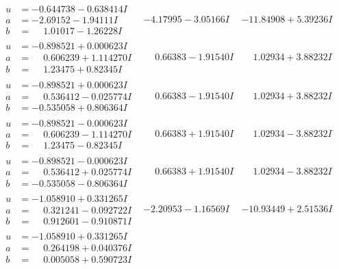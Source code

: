 \documentclass[1p]{elsarticle_modified}
\theoremstyle{definition}
\begin{document}
$$\begin{array}{c|c|c}
\begin{aligned}
u &= -0.644738 - 0.638414 I \\
a &= -2.69152 - 1.94111 I \\
b &= \phantom{-}1.01017 - 1.26228 I\end{aligned}
 & -4.17995 - 3.05166 I & -11.84908 + 5.39236 I \\ \hline\begin{aligned}
u &= -0.898521 + 0.000623 I \\
a &= \phantom{-}0.606239 + 1.114270 I \\
b &= \phantom{-}1.23475 + 0.82345 I\end{aligned}
 & \phantom{-}0.66383 - 1.91540 I & \phantom{-}1.02934 + 3.88232 I \\ \hline\begin{aligned}
u &= -0.898521 + 0.000623 I \\
a &= \phantom{-}0.536412 - 0.025774 I \\
b &= -0.535058 + 0.806364 I\end{aligned}
 & \phantom{-}0.66383 - 1.91540 I & \phantom{-}1.02934 + 3.88232 I \\ \hline\begin{aligned}
u &= -0.898521 - 0.000623 I \\
a &= \phantom{-}0.606239 - 1.114270 I \\
b &= \phantom{-}1.23475 - 0.82345 I\end{aligned}
 & \phantom{-}0.66383 + 1.91540 I & \phantom{-}1.02934 - 3.88232 I \\ \hline\begin{aligned}
u &= -0.898521 - 0.000623 I \\
a &= \phantom{-}0.536412 + 0.025774 I \\
b &= -0.535058 - 0.806364 I\end{aligned}
 & \phantom{-}0.66383 + 1.91540 I & \phantom{-}1.02934 - 3.88232 I \\ \hline\begin{aligned}
u &= -1.058910 + 0.331265 I \\
a &= \phantom{-}0.321241 - 0.092722 I \\
b &= \phantom{-}0.912601 - 0.910871 I\end{aligned}
 & -2.20953 - 1.16569 I & -10.93449 + 2.51536 I \\ \hline\begin{aligned}
u &= -1.058910 + 0.331265 I \\
a &= \phantom{-}0.264198 + 0.040376 I \\
b &= \phantom{-}0.005058 + 0.590723 I\end{aligned}

\end{array}$$
\end{document}
